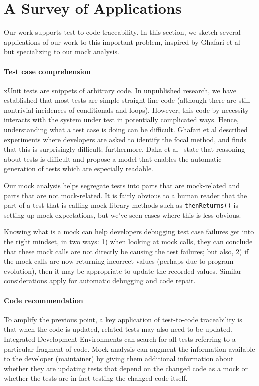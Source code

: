 \section{A Survey of Applications}
\label{sec:applications}

Our work supports test-to-code traceability. In this section, we
sketch several applications of our work to this important problem,
inspired by Ghafari et al~\cite{ghafari15:_autom} but specializing to
our mock analysis.

\paragraph{Test case comprehension} xUnit tests are snippets of arbitrary
code. In unpublished research, we have established that most tests are
simple straight-line code (although there are still nontrivial incidences of
conditionals and loops). However, this code by necessity interacts with
the system under test in potentially complicated ways. Hence,
understanding what a test case is doing can be difficult. Ghafari et
al described experiments where developers are asked to identify the
focal method, and finds that this is surprisingly difficult;
furthermore, Daka et al~\cite{daka15:_model_readab_improv_unit_tests}
state that reasoning about tests is difficult and propose a model that
enables the automatic generation of tests which are especially
readable.

Our mock analysis helps segregate tests into parts that are
mock-related and parts that are not mock-related.  It is fairly
obvious to a human reader that the part of a test that is calling mock
library methods such as \texttt{thenReturns()} is setting up mock
expectations, but we've seen cases where this is less
obvious.

Knowing what is a mock can help developers debugging test case
failures get into the right mindset, in two ways: 1) when looking at
mock calls, they can conclude that these mock calls are not
directly be causing the test failures; but also, 2) if the mock calls
are now returning incorrect values (perhaps due to program evolution),
then it may be appropriate to update the recorded values. Similar considerations
apply for automatic debugging and code repair.

\paragraph{Code recommendation}
To amplify the previous point, a key application of test-to-code
traceability is that when the code is updated, related tests may also
need to be updated. Integrated Development Environments can search for
all tests referring to a particular fragment of code. Mock analysis
can augment the information available to the developer (maintainer) by
giving them additional information about whether they are updating
tests that depend on the changed code as a mock or whether the tests
are in fact testing the changed code itself.


